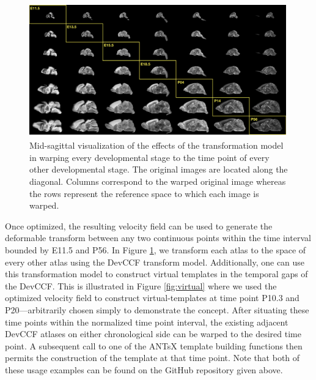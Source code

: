 \documentclass[
  12pt,
]{article}
\begin{document}
\begin{figure}[!htb]
\centering
\includegraphics[width=0.99\textwidth]{Figures/CrossWarp.pdf}
\caption{Mid-sagittal visualization of the effects of the transformation model in
warping every developmental stage to the time point of every other developmental
stage.  The original images are located along the diagonal.  Columns correspond
to the warped original image whereas the rows represent the reference space to which
each image is warped.}
\label{fig:crosswarp}
\end{figure}

Once optimized, the resulting velocity field can be used to generate the
deformable transform between any two continuous points within the time
interval bounded by E11.5 and P56. In Figure \ref{fig:crosswarp}, we
transform each atlas to the space of every other atlas using the DevCCF
transform model. Additionally, one can use this transformation model to
construct virtual templates in the temporal gaps of the DevCCF. This is
illustrated in Figure \ref{fig:virtual} where we used the optimized
velocity field to construct virtual-templates at time point P10.3 and
P20---arbitrarily chosen simply to demonstrate the concept. After
situating these time points within the normalized time point interval,
the existing adjacent DevCCF atlases on either chronological side can be
warped to the desired time point. A subsequent call to one of the ANTsX
template building functions then permits the construction of the
template at that time point. Note that both of these usage examples can
be found on the GitHub repository given above.
\end{document}

